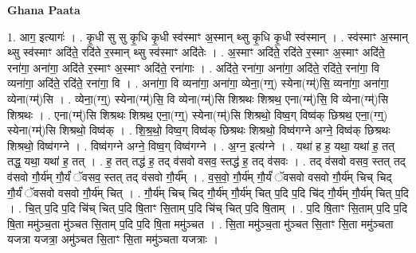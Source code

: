 \documentclass[17pt]{extarticle}
\begin{document}
\textbf{Ghana Paata } \newline

1. आग॒ इत्यागः॑ । . कृ॒धी सु सु कृ॒धि कृ॒धी स्व॑स्माꣳ अ॒स्मान् थ्सु कृ॒धि कृ॒धी स्व॑स्मान् । . स्व॑स्माꣳ अ॒स्मान् थ्सु स्व॑स्माꣳ अदि॑ते॒ रदि॑ते र॒स्मान् थ्सु स्व॑स्माꣳ अदि॑तेः । . अ॒स्माꣳ अदि॑ते॒ रदि॑ते र॒स्माꣳ अ॒स्माꣳ अदि॑ते॒ रना॑गा॒ अना॑गा॒ अदि॑ते र॒स्माꣳ अ॒स्माꣳ अदि॑ते॒ रना॑गाः । . अदि॑ते॒ रना॑गा॒ अना॑गा॒ अदि॑ते॒ रदि॑ते॒ रना॑गा॒ वि व्यना॑गा॒ अदि॑ते॒ रदि॑ते॒ रना॑गा॒ वि । . अना॑गा॒ वि व्यना॑गा॒ अना॑गा॒ व्येना॒(ग्ग्॒) स्येना(ग्म्॑)सि॒ व्यना॑गा॒ अना॑गा॒ व्येना(ग्म्॑)सि । . व्येना॒(ग्ग्॒) स्येना(ग्म्॑)सि॒ वि व्येना(ग्म्॑)सि शिश्रथः शिश्रथ॒ एना(ग्म्॑)सि॒ वि व्येना(ग्म्॑)सि शिश्रथः । . एना(ग्म्॑)सि शिश्रथः शिश्रथ॒ एना॒(ग्ग्॒) स्येना(ग्म्॑)सि शिश्रथो॒ विष्व॒ग् विष्व॑क् छिश्रथ॒ एना॒(ग्ग्॒) स्येना(ग्म्॑)सि शिश्रथो॒ विष्व॑क् । . शि॒श्र॒थो॒ विष्व॒ग् विष्व॑क् छिश्रथः शिश्रथो॒ विष्व॑गग्ने अग्ने॒ विष्व॑क् छिश्रथः शिश्रथो॒ विष्व॑गग्ने । . विष्व॑गग्ने अग्ने॒ विष्व॒ग् विष्व॑गग्ने । . अ॒ग्न॒ इत्य॑ग्ने । . यथा॑ ह ह॒ यथा॒ यथा॑ ह॒ तत् तद्ध॒ यथा॒ यथा॑ ह॒ तत् । . ह॒ तत् तद्ध॑ ह॒ तद् व॑सवो वसव॒ स्तद्ध॑ ह॒ तद् व॑सवः । . तद् व॑सवो वसव॒ स्तत् तद् व॑सवो गौ॒र्य॑म् गौ॒र्यं॑ ॅवसव॒ स्तत् तद् व॑सवो गौ॒र्य᳚म् । . व॒स॒वो॒ गौ॒र्य॑म् गौ॒र्यं॑ ॅवसवो वसवो गौ॒र्य॑म् चिच् चिद् गौ॒र्यं॑ ॅवसवो वसवो गौ॒र्य॑म् चित् । . गौ॒र्य॑म् चिच् चिद् गौ॒र्य॑म् गौ॒र्य॑म् चित् प॒दि प॒दि चि॑द् गौ॒र्य॑म् गौ॒र्य॑म् चित् प॒दि । . चि॒त् प॒दि प॒दि चि॑च् चित् प॒दि षि॒ताꣳ सि॒ताम् प॒दि चि॑च् चित् प॒दि षि॒ताम् । . प॒दि षि॒ताꣳ सि॒ताम् प॒दि प॒दि षि॒ता ममु॑ञ्च॒ता मु॑ञ्चत सि॒ताम् प॒दि प॒दि षि॒ता ममु॑ञ्चत । . सि॒ता ममु॑ञ्च॒ता मु॑ञ्चत सि॒ताꣳ सि॒ता ममु॑ञ्चता यजत्रा यजत्रा॒ अमु॑ञ्चत सि॒ताꣳ सि॒ता ममु॑ञ्चता यजत्राः । \newline
\end{document}
